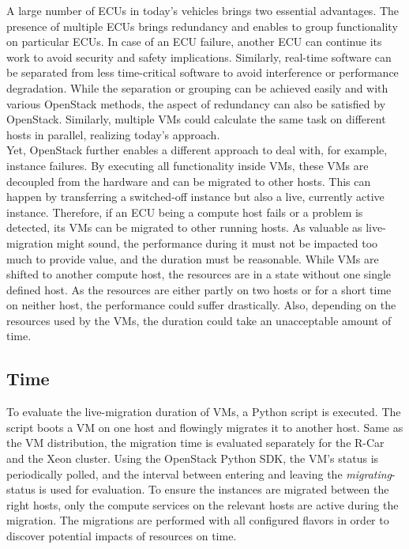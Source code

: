         \noindent A large number of \acp{ECU} in today's vehicles brings two essential advantages.
        The presence of multiple \acp{ECU} brings redundancy and enables to group functionality on particular \acp{ECU}.
        In case of an \ac{ECU} failure, another \ac{ECU} can continue its work to avoid security and safety implications.
        Similarly, real-time software can be separated from less time-critical software to avoid interference or performance degradation.
        While the separation or grouping can be achieved easily and with various OpenStack methods, the aspect of redundancy can also be satisfied by OpenStack.
        Similarly, multiple \acp{VM} could calculate the same task on different hosts in parallel, realizing today's approach.\\
        Yet, OpenStack further enables a different approach to deal with, for example, instance failures.
        By executing all functionality inside \acp{VM}, these \acp{VM} are decoupled from the hardware and can be migrated to other hosts.
        This can happen by transferring a switched-off instance but also a live, currently active instance.
        Therefore, if an \ac{ECU} being a compute host fails or a problem is detected, its \acp{VM} can be migrated to other running hosts. 
        As valuable as live-migration might sound, the performance during it must not be impacted too much to provide value, and the duration must be reasonable.
        While \acp{VM} are shifted to another compute host, the resources are in a state without one single defined host.
        As the resources are either partly on two hosts or for a short time on neither host, the performance could suffer drastically.
        Also, depending on the resources used by the \acp{VM}, the duration could take an unacceptable amount of time.
   
   
    \subsection{Time}
    \label{subsection:usecases_time}

        \noindent To evaluate the live-migration duration of \acp{VM}, a Python script is executed.
        The script boots a \ac{VM} on one host and flowingly migrates it to another host.
        Same as the \ac{VM} distribution, the migration time is evaluated separately for the R-Car and the Xeon cluster. 
        Using the OpenStack Python SDK, the VM's status is periodically polled, and the interval between entering and leaving the \textsl{migrating}-status is used for evaluation.
        To ensure the instances are migrated between the right hosts, only the compute services on the relevant hosts are active during the migration.
        The migrations are performed with all configured flavors in order to discover potential impacts of resources on time.
        
